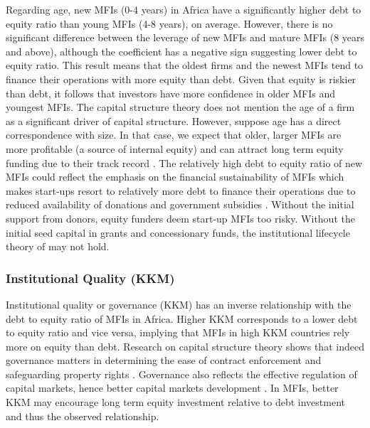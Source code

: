 \documentclass[a4paper, nobind]{templates/ociamthesis}
\begin{document}
Regarding age, new MFIs (0-4 years) in Africa have a significantly higher debt to equity ratio than young MFIs (4-8 years), on average. However, there is no significant difference between the leverage of new MFIs and mature MFIs (8 years and above), although the coefficient has a negative sign suggesting lower debt to equity ratio. This result means that the oldest firms and the newest MFIs tend to finance their operations with more equity than debt. Given that equity is riskier than debt, it follows that investors have more confidence in older MFIs and youngest MFIs. The capital structure theory does not mention the age of a firm as a significant driver of capital structure. However, suppose age has a direct correspondence with size. In that case, we expect that older, larger MFIs are more profitable (a source of internal equity) and can attract long term equity funding due to their track record \autocite{barclay2005capital,barclay2006debt}. The relatively high debt to equity ratio of new MFIs could reflect the emphasis on the financial sustainability of MFIs which makes start-ups resort to relatively more debt to finance their operations due to reduced availability of donations and government subsidies \autocite{gwatidzo2009corporate}. Without the initial support from donors, equity funders deem start-up MFIs too risky. Without the initial seed capital in grants and concessionary funds, the institutional lifecycle theory of \textcite{bayai2016financing} may not hold.

\hypertarget{institutional-quality-kkm}{%
\subsubsection{Institutional Quality (KKM)}\label{institutional-quality-kkm}}

Institutional quality or governance (KKM) has an inverse relationship with the debt to equity ratio of MFIs in Africa. Higher KKM corresponds to a lower debt to equity ratio and vice versa, implying that MFIs in high KKM countries rely more on equity than debt. Research on capital structure theory shows that indeed governance matters in determining the ease of contract enforcement and safeguarding property rights \autocite{butkiewicz2006institutional}. Governance also reflects the effective regulation of capital markets, hence better capital markets development \autocite{matias2017there,ombati2016effects}. In MFIs, better KKM may encourage long term equity investment relative to debt investment and thus the observed relationship.
\end{document}
